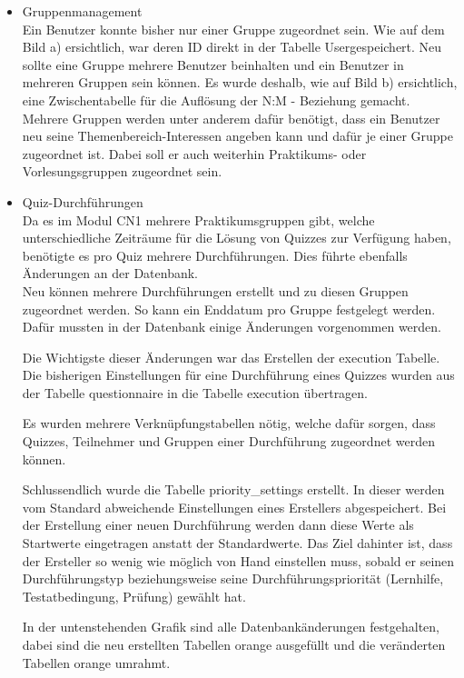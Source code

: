 \begin{itemize}
	\item Gruppenmanagement\\
	Ein Benutzer konnte bisher nur einer Gruppe zugeordnet sein. Wie auf dem Bild a) ersichtlich, war deren ID direkt in der Tabelle \glqq User\grqq gespeichert. Neu sollte eine Gruppe mehrere Benutzer beinhalten und ein Benutzer in mehreren Gruppen sein können. Es wurde deshalb, wie auf Bild b) ersichtlich, eine Zwischentabelle für die Auflösung der N:M - Beziehung gemacht.\\
	Mehrere Gruppen werden unter anderem dafür benötigt, dass ein Benutzer neu seine Themenbereich-Interessen angeben kann und dafür je einer Gruppe zugeordnet ist. Dabei soll er auch weiterhin Praktikums- oder Vorlesungsgruppen zugeordnet sein.
	\item Quiz-Durchführungen\\
	Da es im Modul \gls{CN1} mehrere Praktikumsgruppen gibt, welche unterschiedliche Zeiträume für die Lösung von Quizzes zur Verfügung haben, benötigte es pro Quiz mehrere Durchführungen. Dies führte ebenfalls Änderungen an der Datenbank. \\
	Neu können mehrere Durchführungen erstellt und zu diesen Gruppen zugeordnet werden. So kann ein Enddatum pro Gruppe festgelegt werden.
	Dafür mussten in der Datenbank einige Änderungen vorgenommen werden. 
	
	Die Wichtigste dieser Änderungen war das Erstellen der execution Tabelle. Die bisherigen Einstellungen für eine Durchführung eines Quizzes wurden aus der Tabelle questionnaire in die Tabelle execution übertragen.
	
	Es wurden mehrere Verknüpfungstabellen nötig, welche dafür sorgen, dass Quizzes, Teilnehmer und Gruppen einer Durchführung zugeordnet werden können.
	
	Schlussendlich wurde die Tabelle priority\_settings erstellt. In dieser werden vom Standard abweichende Einstellungen eines Erstellers abgespeichert. Bei der Erstellung einer neuen Durchführung werden dann diese Werte als Startwerte eingetragen anstatt der Standardwerte. Das Ziel dahinter ist, dass der Ersteller so wenig wie möglich von Hand einstellen muss, sobald er seinen Durchführungstyp beziehungsweise seine Durchführungspriorität (Lernhilfe, Testatbedingung, Prüfung) gewählt hat.
	
	In der untenstehenden Grafik sind alle Datenbankänderungen festgehalten, dabei sind die neu erstellten Tabellen orange ausgefüllt und die veränderten Tabellen orange umrahmt.
	

\end{itemize}
